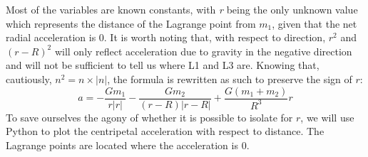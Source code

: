 Most of the variables are known constants, with \textit{r} being the only unknown value which represents the distance of the Lagrange point from $m_1$, given that the net radial acceleration is 0.
It is worth noting that, with respect to direction, $r^2$ and $(r-R)^2$ will only reflect acceleration due to gravity in the negative direction and will not be sufficient to tell us where L1 and L3 are.
Knowing that, cautiously, $n^2 = n \times |n|$, the formula is rewritten as such to preserve the sign of $r$:
\begin{equation*}
	a = -\frac{Gm_1}{r|r|} - \frac{Gm_2}{(r - R)|r - R|} + \frac{G(m_1+m_2)}{R^3}r
\end{equation*}
To save ourselves the agony of whether it is possible to isolate for $r$, we will use Python to plot the centripetal acceleration with respect to distance. The Lagrange points are located where the acceleration is 0.
